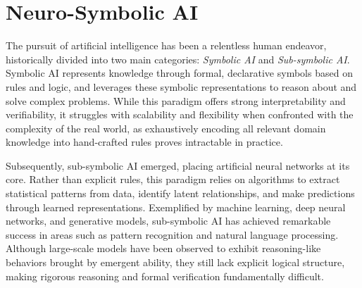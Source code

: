







\section{Neuro-Symbolic AI}

The pursuit of artificial intelligence has been a relentless human endeavor, historically divided into two main categories: \textit{Symbolic AI} and \textit{Sub-symbolic AI}. Symbolic AI represents knowledge through formal, declarative symbols based on rules and logic, and leverages these symbolic representations to reason about and solve complex problems. While this paradigm offers strong interpretability and verifiability, it struggles with scalability and flexibility when confronted with the complexity of the real world, as exhaustively encoding all relevant domain knowledge into hand-crafted rules proves intractable in practice. 

Subsequently, sub-symbolic AI emerged, placing artificial neural networks at its core. Rather than explicit rules, this paradigm relies on algorithms to extract statistical patterns from data, identify latent relationships, and make predictions through learned representations. Exemplified by machine learning, deep neural networks, and generative models, sub-symbolic AI has achieved remarkable success in areas such as pattern recognition and natural language processing. Although large-scale models have been observed to exhibit reasoning-like behaviors brought by emergent ability, they still lack explicit logical structure, making rigorous reasoning and formal verification fundamentally difficult.


